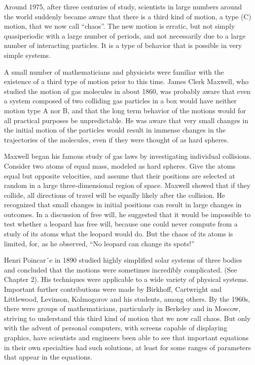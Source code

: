 \documentclass[12pt]{article}
\begin{document}
Around 1975, after three centuries of study, scientists in large numbers around the world suddenly became 
aware that there is a third kind of motion, a type (C) motion, that we now call “chaos”. The new motion is 
erratic, but not simply quasiperiodic with a large number of periods, and not necessarily due to a large 
number of interacting particles. It is a type of behavior that is possible in very simple systems.

A small number of mathematicians and physicists were familiar with the existence of a third type of motion 
prior to this time. James Clerk Maxwell, who studied the motion of gas molecules in about 1860, was 
probably aware that even a system composed of two colliding gas particles in a box would have neither 
motion type A nor B, and that the long term behavior of the motions would for all practical purposes be 
unpredictable. He was aware that very small changes in the initial motion of the particles would result in 
immense changes in the trajectories of the molecules, even if they were thought of as hard spheres.

Maxwell began his famous study of gas laws by investigating individual collisions. Consider two atoms of 
equal mass, modeled as hard spheres. Give the atoms equal but opposite velocities, and assume that their 
positions are selected at random in a large three-dimensional region of space. Maxwell showed that if they 
collide, all directions of travel will be equally likely after the collision. He recognized that small 
changes in initial positions can result in large changes in outcomes. In a discussion of free will, he 
suggested that it would be impossible to test whether a leopard has free will, because one could never 
compute from a study of its atoms what the leopard would do. But the chaos of its atoms is limited, for, as 
he observed, “No leopard can change its spots!”

Henri Poincar´e in 1890 studied highly simpliﬁed solar systems of three bodies and concluded that the 
motions were sometimes incredibly complicated. (See Chapter 2). His techniques were applicable to a wide 
variety of physical systems. Important further contributions were made by Birkhoff, Cartwright and 
Littlewood, Levinson, Kolmogorov and his students, among others. By the 1960s, there were groups of 
mathematicians, particularly in Berkeley and in Moscow, striving to understand this third kind of motion 
that we now call chaos. But only with the advent of personal computers, with screens capable of displaying 
graphics, have scientists and engineers been able to see that important equations in their own specialties 
had such solutions, at least for some ranges of parameters that appear in the equations.
\end{document}
